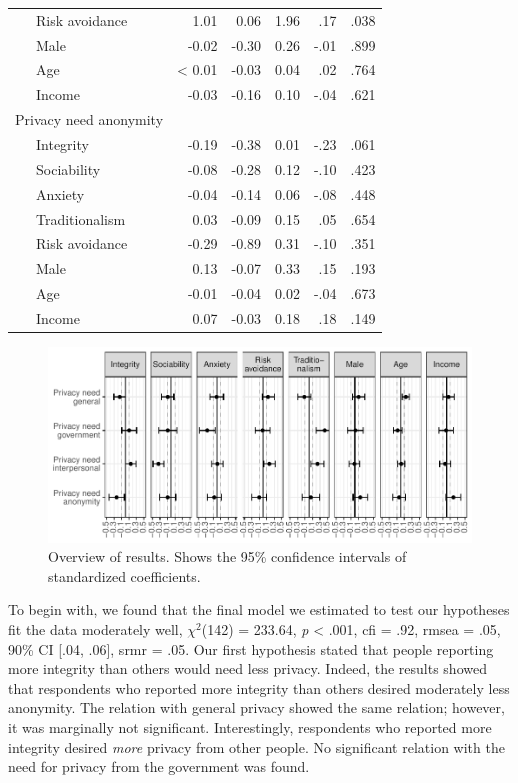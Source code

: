 \documentclass[man,floatsintext]{apa6}
\theoremstyle{definition}
\theoremstyle{definition}
\theoremstyle{definition}
\theoremstyle{remark}
\begin{document}
\begin{table}[tbp]
\begin{center}
\begin{threeparttable}
{\begin{tabular}{lrrrrr}
\ \ \ Risk avoidance & 1.01 & 0.06 & 1.96 & .17 & .038\\
\ \ \ Male & -0.02 & -0.30 & 0.26 & -.01 & .899\\
\ \ \ Age & < 0.01 & -0.03 & 0.04 & .02 & .764\\
\ \ \ Income & -0.03 & -0.16 & 0.10 & -.04 & .621\\
Privacy need anonymity &  &  &  &  & \\
\ \ \ Integrity & -0.19 & -0.38 & 0.01 & -.23 & .061\\
\ \ \ Sociability & -0.08 & -0.28 & 0.12 & -.10 & .423\\
\ \ \ Anxiety & -0.04 & -0.14 & 0.06 & -.08 & .448\\
\ \ \ Traditionalism & 0.03 & -0.09 & 0.15 & .05 & .654\\
\ \ \ Risk avoidance & -0.29 & -0.89 & 0.31 & -.10 & .351\\
\ \ \ Male & 0.13 & -0.07 & 0.33 & .15 & .193\\
\ \ \ Age & -0.01 & -0.04 & 0.02 & -.04 & .673\\
\ \ \ Income & 0.07 & -0.03 & 0.18 & .18 & .149\\
\bottomrule
\end{tabular}
}
\end{threeparttable}
\end{center}
\end{table}

\begin{figure}
\centering
\includegraphics{manuscript_files/figure-latex/results-factor-1.pdf}
\caption{\label{fig:results-factor}Overview of results. Shows the 95\%
confidence intervals of standardized coefficients.}
\end{figure}

To begin with, we found that the final model we estimated to test our
hypotheses fit the data moderately well, \(\chi^2\)(142) = 233.64,
\textit{p} \textless{} .001, cfi = .92, rmsea = .05, 90\% CI {[}.04,
.06{]}, srmr = .05. Our first hypothesis stated that people reporting
more integrity than others would need less privacy. Indeed, the results
showed that respondents who reported more integrity than others desired
moderately less anonymity. The relation with general privacy showed the
same relation; however, it was marginally not significant.
Interestingly, respondents who reported more integrity desired
\emph{more} privacy from other people. No significant relation with the
need for privacy from the government was found.
\end{document}
